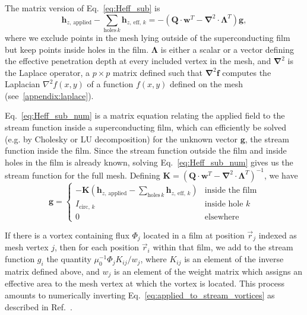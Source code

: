 \documentclass[final,3p,times,twocolumn]{elsarticle}
\newcounter{bla}
\begin{document}
The matrix version of Eq.~\ref{eq:Heff_sub} is
\begin{equation}
    \label{eq:Heff_sub_num}
     \mathbf{h}_{z,\,\mathrm{applied}} - \sum_{\mathrm{holes}\, k}\mathbf{h}_{z,\,\mathrm{eff},\,k} = -(\mathbf{Q}\cdot\mathbf{w}^T-\mathbf{\nabla}^2\cdot \mathbf{\Lambda}^T)\mathbf{g},
\end{equation}
where we exclude points in the mesh lying outside of the superconducting film but keep points
inside holes in the film. $\mathbf{\Lambda}$ is either a scalar or a vector defining the effective penetration depth at every included vertex in the mesh, and $\mathbf{\nabla}^2$
is the Laplace operator, a $p\times p$ matrix defined such that $\mathbf{\nabla}^2\mathbf{f}$ computes the Laplacian $\nabla^2f(x,y)$ of a function $f(x,y)$ defined on the mesh  (see~\ref{appendix:laplace}).

Eq.~\ref{eq:Heff_sub_num} is a matrix equation relating the applied field to the stream function
inside a superconducting film, which can efficiently be solved (e.g. by Cholesky or LU decomposition) for the unknown vector $\mathbf{g}$, the stream function inside the film. Since the stream function outside the film and inside holes in the film is already known, solving Eq.~\ref{eq:Heff_sub_num} gives us the stream function for the full mesh. Defining $\mathbf{K} = \left(\mathbf{Q}\cdot\mathbf{w}^T-\mathbf{\nabla}^2\cdot\mathbf{\Lambda}^T\right)^{-1}$, we have
\begin{equation}
    \label{eq:full_stream}
    \mathbf{g} = \begin{cases}
        -\mathbf{K}
        \left(\mathbf{h}_{z,\,\mathrm{applied}} - \sum_{\mathrm{holes}\,k}\mathbf{h}_{z,\,\mathrm{eff},\,k}\right)
            & \text{inside the film}\\
        I_{\mathrm{circ},\,k}
            & \text{inside hole }k\\
        0
            & \text{elsewhere}
    \end{cases}
\end{equation}

If there is a vortex containing flux $\Phi_j$ located in a film at position $\vec{r}_j$ indexed as mesh vertex $j$, then for each position $\vec{r}_i$ within that film, we add to the stream function $g_i$ the quantity $\mu_0^{-1}\Phi_jK_{ij} / w_{j}$, where $K_{ij}$ is an element of the inverse matrix defined above, and $w_{j}$ is an element of the weight matrix which assigns an effective area to the mesh vertex at which the vortex is located. This process amounts to numerically inverting Eq.~\ref{eq:applied_to_stream_vortices} as described in Ref.~\cite{Brandt2005-wj}.
\end{document}
